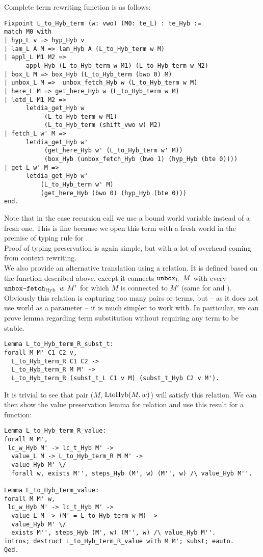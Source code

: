 Complete term rewriting function is as follows:
\begin{verbatim}
Fixpoint L_to_Hyb_term (w: vwo) (M0: te_L) : te_Hyb :=
match M0 with
| hyp_L v => hyp_Hyb v
| lam_L A M => lam_Hyb A (L_to_Hyb_term w M)
| appl_L M1 M2 => 
      appl_Hyb (L_to_Hyb_term w M1) (L_to_Hyb_term w M2)
| box_L M => box_Hyb (L_to_Hyb_term (bwo 0) M)
| unbox_L M =>  unbox_fetch_Hyb w (L_to_Hyb_term w M)
| here_L M => get_here_Hyb w (L_to_Hyb_term w M)
| letd_L M1 M2 => 
      letdia_get_Hyb w 
           (L_to_Hyb_term w M1) 
           (L_to_Hyb_term (shift_vwo w) M2)
| fetch_L w' M => 
      letdia_get_Hyb w' 
           (get_here_Hyb w' (L_to_Hyb_term w' M))
           (box_Hyb (unbox_fetch_Hyb (bwo 1) (hyp_Hyb (bte 0))))
| get_L w' M => 
      letdia_get_Hyb w' 
          (L_to_Hyb_term w' M)
          (get_here_Hyb (bwo 0) (hyp_Hyb (bte 0)))
end.
\end{verbatim}
Note that in the \bboxe{} case recursion call we use a bound world variable instead of a fresh one. This is fine because we open this term with a fresh world in the premise of typing rule for \bboxe{}.\\

Proof of typing preservation is again simple, but with a lot of overhead coming from context rewriting.\\

We also provide an alternative translation using a relation. It is defined based on the function described above, except it connects $\unbox[\tL]{M}$ with every $\unboxfetch[\tHyb]{w}{M'}$ for which $M$ is connected to $M'$ (same for \heree{} and ). Obviously this relation is capturing too many pairs or terms, but -- as it does not use world as a parameter -- it is much simpler to work with. In particular, we can prove lemma regarding term substitution without requiring any term to be stable.
\begin{verbatim}
Lemma L_to_Hyb_term_R_subst_t:
forall M M' C1 C2 v,
  L_to_Hyb_term_R C1 C2 ->
  L_to_Hyb_term_R M M' ->
  L_to_Hyb_term_R (subst_t_L C1 v M) (subst_t_Hyb C2 v M').
\end{verbatim}

It is trivial to see that pair ($M$, $\funLtoHyb{M}{w}$) will satisfy this relation. We can then show the value preservation lemma for relation and use this result for a function:
\begin{verbatim}
Lemma L_to_Hyb_term_R_value:
forall M M',
 lc_w_Hyb M' -> lc_t_Hyb M' ->
  value_L M -> L_to_Hyb_term_R M M' ->
  value_Hyb M' \/
  forall w, exists M'', steps_Hyb (M', w) (M'', w) /\ value_Hyb M''.

Lemma L_to_Hyb_term_value:
forall M M' w,
 lc_w_Hyb M' -> lc_t_Hyb M' ->
  value_L M -> (M' = L_to_Hyb_term w M) ->
  value_Hyb M' \/
  exists M'', steps_Hyb (M', w) (M'', w) /\ value_Hyb M''.
intros; destruct L_to_Hyb_term_R_value with M M'; subst; eauto.
Qed.
\end{verbatim}

